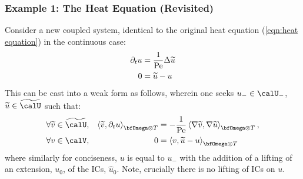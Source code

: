 \subsubsection{Example 1: The Heat Equation (Revisited)}
    Consider a new coupled system, identical to the original heat equation (\ref{eqn:heat equation}) in the continuous case:
    \begin{align}
        \partial_{t}u  &=  \frac{1}{\mathrm{Pe}}\Delta\widetilde{u}  \\
                    0  &=  \widetilde{u} - u
    \end{align}
    This can be cast into a weak form as follows, wherein one seeks $u_{-}  \in  \calU_{-}$, $\widetilde{u}  \in  \widetilde{\calU}$ such that:
    \begin{align}
        &\forall  \widetilde{v}  \in  \widetilde{\calU},  &  \left\langle\widetilde{v}, \partial_{t}u\right\rangle_{\bfOmega\otimes T}  &=  - \frac{1}{\rmPe}\left\langle\nabla\widetilde{v}, \nabla\widetilde{u}\right\rangle_{\bfOmega\otimes T},  \\
        &\forall  v  \in  \calV,  &  0  &=  \left\langle v, \widetilde{u} - u\right\rangle_{\bfOmega\otimes T}
    \end{align}
    where similarly for conciseness, $u$ is equal to $u_{-}$ with the addition of a lifting of an extension, $u_{0}$, of the ICs, $\widehat{u}_{0}$. Note, crucially there is no lifting of ICs on $u$.

